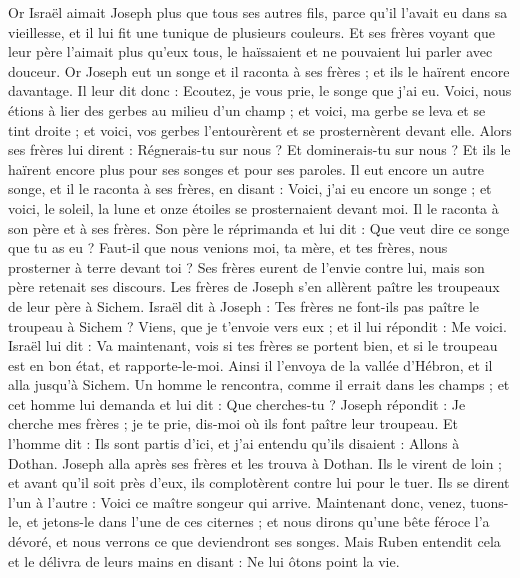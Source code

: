 \begin{multicols}{2}
Or Israël aimait Joseph plus que tous ses autres fils, parce qu'il l'avait eu dans sa vieillesse, et il lui fit une tunique de plusieurs couleurs.
Et ses frères voyant que leur père l'aimait plus qu'eux tous, le haïssaient et ne pouvaient lui parler avec douceur.
Or Joseph eut un songe et il raconta à ses frères ; et ils le haïrent encore davantage.
Il leur dit donc : Ecoutez, je vous prie, le songe que j'ai eu.
Voici, nous étions à lier des gerbes au milieu d'un champ ; et voici, ma gerbe se leva et se tint droite ; et voici, vos gerbes l'entourèrent et se prosternèrent devant elle.
Alors ses frères lui dirent : Régnerais-tu sur nous ? Et dominerais-tu sur nous ? Et ils le haïrent encore plus pour ses songes et pour ses paroles.
Il eut encore un autre songe, et il le raconta à ses frères, en disant : Voici, j'ai eu encore un songe ; et voici, le soleil, la lune et onze étoiles se prosternaient devant moi.
Il le raconta à son père et à ses frères. Son père le réprimanda et lui dit : Que veut dire ce songe que tu as eu ? Faut-il que nous venions moi, ta mère, et tes frères, nous prosterner à terre devant toi ?
Ses frères eurent de l'envie contre lui, mais son père retenait ses discours.
Les frères de Joseph s'en allèrent paître les troupeaux de leur père à Sichem.
Israël dit à Joseph : Tes frères ne font-ils pas paître le troupeau à Sichem ? Viens, que je t'envoie vers eux ; et il lui répondit : Me voici.
Israël lui dit : Va maintenant, vois si tes frères se portent bien, et si le troupeau est en bon état, et rapporte-le-moi. Ainsi il l'envoya de la vallée d'Hébron, et il alla jusqu'à Sichem.
Un homme le rencontra, comme il errait dans les champs ; et cet homme lui demanda et lui dit : Que cherches-tu ?
Joseph répondit : Je cherche mes frères ; je te prie, dis-moi où ils font paître leur troupeau.
Et l'homme dit : Ils sont partis d'ici, et j'ai entendu qu'ils disaient : Allons à Dothan. Joseph alla après ses frères et les trouva à Dothan.
Ils le virent de loin ; et avant qu'il soit près d'eux, ils complotèrent contre lui pour le tuer.
Ils se dirent l'un à l'autre : Voici ce maître songeur qui arrive.
 Maintenant donc, venez, tuons-le, et jetons-le dans l'une de ces citernes ; et nous dirons qu'une bête féroce l'a dévoré, et nous verrons ce que deviendront ses songes.
Mais Ruben entendit cela et le délivra de leurs mains en disant : Ne lui ôtons point la vie.

\end{multicols}
